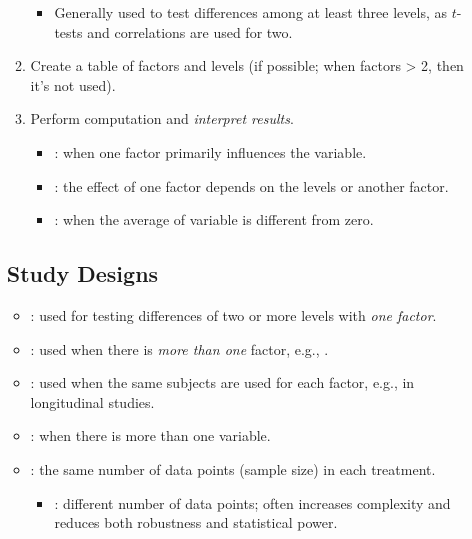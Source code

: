 \begin{itemize}
\begin{enumerate}
\begin{itemize}
          \item Generally used to test differences among at least three levels, as \(t\)-tests and correlations are used for two.
        \end{itemize}
      \item Create a table of factors and levels (if possible; when factors > 2, then it's not used).
      \item Perform computation and \emph{interpret results}.
        \begin{itemize}
          \item {}: when one factor primarily influences the  variable.
          \item {}: the effect of one factor depends on the levels or another factor.
          \item {}: when the average of  variable is different from zero.
        \end{itemize}
    \end{enumerate}

  \subsection{Study Designs}
  \begin{itemize}
    \item {}: used for testing differences of two or more levels with \emph{one factor}.
    \item {}: used when there is \emph{more than one} factor, e.g., \hyperref[Subsection: Two-Way ANOVA]{}.
    \item {}: used when the same subjects are used for each factor, e.g., in longitudinal studies.
    \item {}: when there is more than one  variable.
    \item {}: the same number of data points (sample size) in each treatment.
      \begin{itemize}
        \item {}: different number of data points; often increases complexity and reduces both robustness and statistical power. 
      \end{itemize}
  \end{itemize}
    

\end{itemize}
